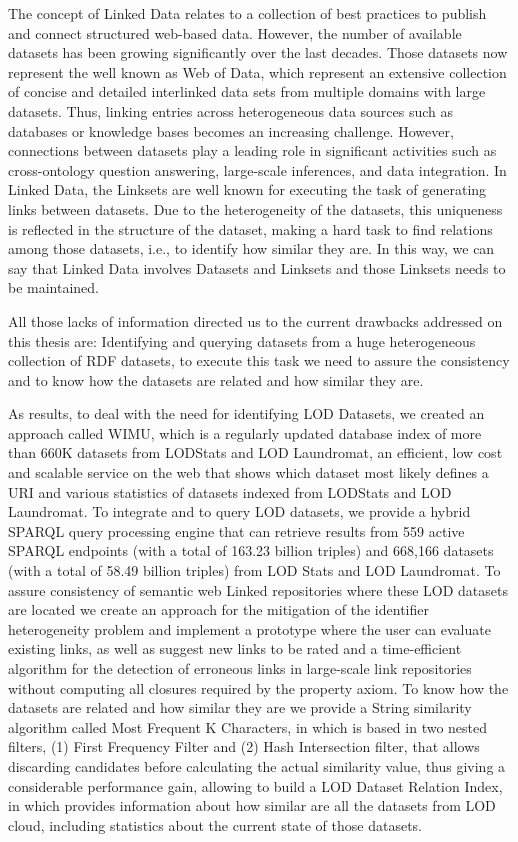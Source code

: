 The concept of Linked Data relates to a collection of best practices to publish and connect structured web-based data. However, the number of available datasets has been growing significantly over the last decades. Those datasets now represent the well known as Web of Data, which represent an extensive collection of concise and detailed interlinked data sets from multiple domains with large datasets. Thus, linking entries across heterogeneous data sources such as databases or knowledge bases becomes an increasing challenge. However, connections between datasets play a leading role in significant activities such as cross-ontology question answering, large-scale inferences, and data integration. In Linked Data, the Linksets are well known for executing the task of generating links between datasets. Due to the heterogeneity of the datasets, this uniqueness is reflected in the structure of the dataset, making a hard task to find relations among those datasets, i.e., to identify how similar they are. In this way, we can say that Linked Data involves Datasets and Linksets and those Linksets needs to be maintained.

All those lacks of information directed us to the current drawbacks addressed on this thesis are: Identifying and querying datasets from a huge heterogeneous collection of RDF datasets, to execute this task we need to assure the consistency and to know how the datasets are related and how similar they are. 

As results, to deal with the need for identifying LOD Datasets, we created an approach called WIMU, which is a regularly updated database index of more than 660K datasets from LODStats and LOD Laundromat, an efficient, low cost and scalable service on the web that shows which dataset most likely defines a URI and various statistics of datasets indexed from LODStats and LOD Laundromat. To integrate and to query LOD datasets, we provide a hybrid SPARQL query processing engine that can retrieve results from 559 active SPARQL endpoints (with a total of 163.23 billion triples) and 668,166 datasets (with a total of 58.49 billion triples) from LOD Stats and LOD Laundromat. To assure consistency of semantic web Linked repositories where these LOD datasets are located we create an approach for the mitigation of the identifier heterogeneity problem and implement a prototype where the user can evaluate existing links, as well as suggest new links to be rated and a time-efficient algorithm for the detection of erroneous links in large-scale link repositories without computing all closures required by the property axiom. To know how the datasets are related and how similar they are we provide a String similarity algorithm called Most Frequent K Characters, in which is based in two nested filters, (1) First Frequency Filter and (2) Hash Intersection filter, that allows discarding candidates before calculating the actual similarity value, thus giving a considerable performance gain, allowing to build a LOD Dataset Relation Index, in which provides information about how similar are all the datasets from LOD cloud, including statistics about the current state of those datasets.

